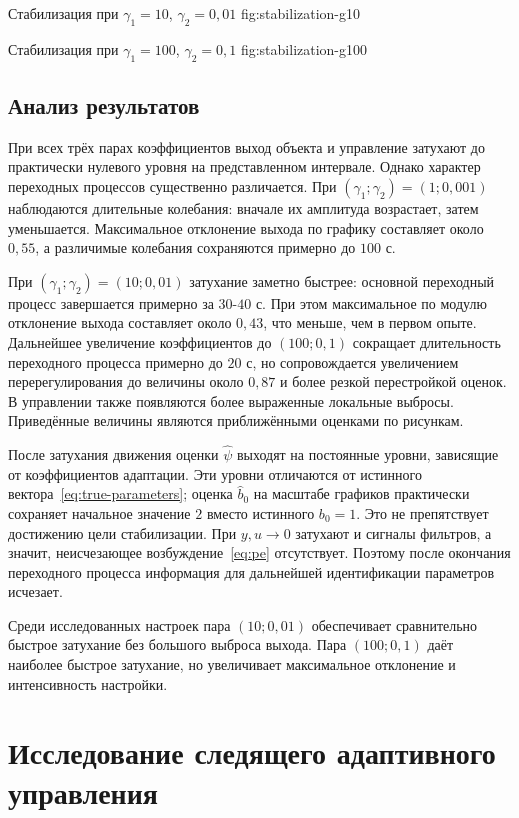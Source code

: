   {Стабилизация при $\gamma_1=10$, $\gamma_2=0{,}01$}
  {fig:stabilization-g10}

  {Стабилизация при $\gamma_1=100$, $\gamma_2=0{,}1$}
  {fig:stabilization-g100}


\subsection{Анализ результатов}

При всех трёх парах коэффициентов выход объекта и управление
затухают до практически нулевого уровня на представленном интервале.
Однако характер переходных процессов существенно различается.
При $(\gamma_1;\gamma_2)=(1;0{,}001)$ наблюдаются длительные
колебания: вначале их амплитуда возрастает, затем уменьшается.
Максимальное отклонение выхода по графику составляет около $0{,}55$,
а различимые колебания сохраняются примерно до $100$ с.

При $(\gamma_1;\gamma_2)=(10;0{,}01)$ затухание заметно быстрее:
основной переходный процесс завершается примерно за $30$-$40$ с.
При этом максимальное по модулю отклонение выхода составляет
около $0{,}43$, что меньше, чем в первом опыте.
Дальнейшее увеличение коэффициентов до $(100;0{,}1)$
сокращает длительность переходного процесса примерно до $20$ с,
но сопровождается увеличением перерегулирования
до величины около $0{,}87$ и более резкой перестройкой оценок.
В управлении также появляются более выраженные локальные выбросы.
Приведённые величины являются приближёнными оценками по рисункам.

После затухания движения оценки $\hat\psi$ выходят на постоянные
уровни, зависящие от коэффициентов адаптации.
Эти уровни отличаются от истинного вектора~\eqref{eq:true-parameters};
оценка $\hat b_0$ на масштабе графиков практически сохраняет
начальное значение $2$ вместо истинного $b_0=1$.
Это не препятствует достижению цели стабилизации.
При $y,u\to0$ затухают и сигналы фильтров, а значит,
неисчезающее возбуждение~\eqref{eq:pe} отсутствует.
Поэтому после окончания переходного процесса информация
для дальнейшей идентификации параметров исчезает.

Среди исследованных настроек пара $(10;0{,}01)$
обеспечивает сравнительно быстрое затухание без большого выброса выхода.
Пара $(100;0{,}1)$ даёт наиболее быстрое затухание,
но увеличивает максимальное отклонение и интенсивность настройки.


\section{Исследование следящего адаптивного управления}

